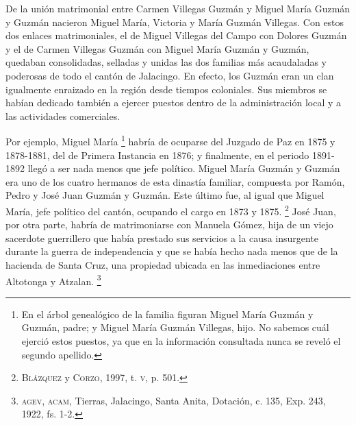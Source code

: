 \documentclass[14pt,twoside,final]{extbook} %
\let\oldfootnote\footnote
\renewcommand\footnote[1]{%
\oldfootnote{\hspace{1mm}#1}}
\begin{document}
De la unión matrimonial entre Carmen Villegas Guzmán y Miguel María Guzmán y Guzmán nacieron Miguel María, Victoria y María Guzmán Villegas. Con estos dos enlaces matrimoniales, el de Miguel Villegas del Campo con Dolores Guzmán y el de Carmen Villegas Guzmán con Miguel María Guzmán y Guzmán, quedaban consolidadas, selladas y unidas las dos familias más acaudaladas y poderosas de todo el cantón de Jalacingo. En efecto, los Guzmán eran un clan igualmente enraizado en la región desde tiempos coloniales. Sus miembros se habían dedicado también a ejercer puestos dentro de la administración local y a las actividades comerciales.

Por ejemplo, Miguel María\footnote{En el árbol genealógico de la familia figuran Miguel María Guzmán y Guzmán, padre; y Miguel María Guzmán Villegas, hijo. No sabemos cuál ejerció estos puestos, ya que en la información consultada nunca se reveló el segundo apellido.} habría de ocuparse del Juzgado de Paz en 1875 y 1878-1881, del de Primera Instancia en 1876; y finalmente, en el periodo 1891-1892
llegó a ser nada menos que jefe político. Miguel María Guzmán y Guzmán era uno de los cuatro hermanos de esta dinastía familiar, compuesta por Ramón, Pedro y José Juan Guzmán y Guzmán. Este último fue, al igual que Miguel María, jefe político del cantón, ocupando el cargo en 1873 y 1875.\footnote{\textsc{Blázquez} y \textsc{Corzo}, 1997, t. \textsc{v}, p. 501.} José Juan, por otra parte, habría de matrimoniarse con Manuela Gómez, hija de un viejo sacerdote guerrillero que había prestado sus servicios a la causa insurgente durante la guerra de independencia y que se había hecho
nada menos que de la hacienda de Santa Cruz, una propiedad ubicada en las inmediaciones entre Altotonga y Atzalan.\footnote{\textsc{agev, acam}, Tierras, Jalacingo, Santa Anita, Dotación, c. 135, Exp. 243, 1922, fs. 1-2.}
\end{document}
